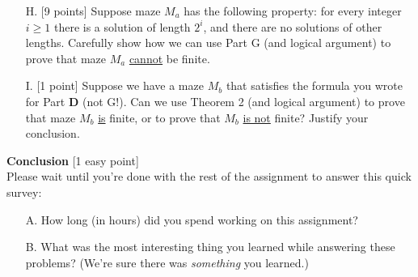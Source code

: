 \documentclass[12pt,letterpaper,boxed,cm]{hmcpset}
\newcommand{\pn}[1]{\left( #1 \right)}
\newcommand{\ra}[0]{\rightarrow}
\begin{document}
\begin{problem} [2. cont.]
\begin{enumerate}
        Negate the formula in D and then find an equivalent formula where the $\neg$ has been pushed “inwards” as far as possible. [For example, you can replace $\neg\exists n\ldots$ by $\forall n. \neg\ldots$, and so on. It might be helpful to push negation into conjunctions like $\neg\pn{\phi\land\ldots\land\psi\land\theta}$ as $\pn{\phi\land\ldots\land\psi \ra \neg\theta}$ instead of DeMorgan’s $\pn{\neg\phi\lor\ldots\lor\neg\psi\lor\neg\theta}$.]
        \item [H.] [9 points] Suppose maze $M_a$ has the following property: for every integer $i \ge 1$ there is a solution of length $2^i$, and there are no solutions of other lengths. Carefully show how we can use Part G (and logical argument) to prove that maze $M_a$ \ul{cannot} be finite.
        \item [I.] [1 point] Suppose we have a maze $M_b$ that satisfies the formula you wrote for Part \textbf{D} (not G!). Can we use Theorem 2 (and logical argument) to prove that maze $M_b$ \ul{is} finite, or to prove that $M_b$ \ul{is not} finite? Justify your conclusion.
    \end{enumerate}
\end{problem}

\begin{solution}
    \vfill
\end{solution}
\newpage

\begin{problem}[3.]
    \textbf{Conclusion} [1 easy point]\\
    Please wait until you’re done with the rest of the assignment to answer this quick survey:
    \begin{enumerate}
        \item [A.] How long (in hours) did you spend working on this assignment?
        \item [B.] What was the most interesting thing you learned while answering these problems? (We’re sure there was \emph{something} you learned.)
    \end{enumerate}
\end{problem}

\begin{solution}
    \vfill
\end{solution}
\end{document}
